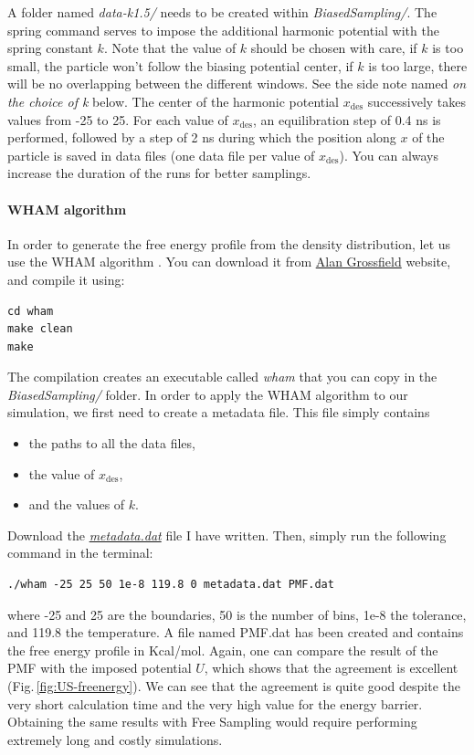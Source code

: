 \documentclass[9pt,tutorial]{livecoms}
\begin{document}
A folder named \textit{data-k1.5/} needs to be created within \textit{BiasedSampling/}. The spring command serves to impose the additional harmonic potential with the spring constant $k$. Note that the value of $k$ should be chosen with care, if $k$ is too small, the particle won't follow the biasing potential center, if $k$ is too large, there will be no overlapping between the different windows. See the side note named \textit{on the choice of k} below. The center of the harmonic potential $x_\text{des}$ successively takes values from -25 to 25. For each value of $x_\text{des}$, an equilibration step of 0.4 ns is performed, followed by a step of 2 ns during which the position along $x$ of the particle is saved in data files (one data file per value of $x_\text{des}$). You can always increase the duration of the runs for better samplings.

\paragraph{WHAM algorithm}
\noindent In order to generate the free energy profile from the density distribution,
let us use the WHAM algorithm \cite{grossfieldimplementation}. You can download it from \href{http://membrane.urmc.rochester.edu/?page_id=126}{Alan Grossfield} website, and compile it using: 
{\normalsize \begin{verbatim}
cd wham
make clean
make
\end{verbatim}}
\noindent The compilation creates an executable called \textit{wham} that you can copy in the \textit{BiasedSampling/} folder. In order to apply the WHAM algorithm to our simulation, we first need to create a metadata file. This file simply contains 
\begin{itemize}
\item the paths to all the data files,
\item the value of $x_\text{des}$,
\item and the values of $k$.
\end{itemize}
Download the \href{https://raw.githubusercontent.com/lammpstutorials/lammpstutorials-article/main/files/tutorial7/metadata.dat}{\textit{metadata.dat}} file I have written. Then, simply run the following command in the terminal:
{\normalsize \begin{verbatim}
./wham -25 25 50 1e-8 119.8 0 metadata.dat PMF.dat
\end{verbatim}}
where -25 and 25 are the boundaries, 50 is the number of bins, 1e-8 the tolerance, and 119.8 the temperature. A file named
PMF.dat has been created and contains the free energy profile in Kcal/mol. Again, one can compare the result of the PMF with the imposed potential $U$, which shows that the agreement is excellent (Fig.\,\ref{fig:US-freenergy}). We can see that the agreement is quite good despite the very short calculation time and the very high value for the energy barrier. Obtaining the same results with Free Sampling would require performing extremely long and costly simulations.
\end{document}
